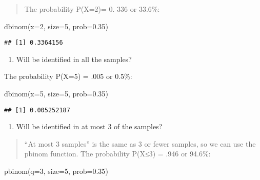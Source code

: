 \documentclass[
]{memoir}
\newenvironment{Shaded}{\begin{snugshade}}{\end{snugshade}}
\newcommand{\AttributeTok}[1]{\textcolor[rgb]{0.77,0.63,0.00}{#1}}
\newcommand{\DecValTok}[1]{\textcolor[rgb]{0.00,0.00,0.81}{#1}}
\newcommand{\FloatTok}[1]{\textcolor[rgb]{0.00,0.00,0.81}{#1}}
\newcommand{\FunctionTok}[1]{\textcolor[rgb]{0.00,0.00,0.00}{#1}}
\newcommand{\NormalTok}[1]{#1}
\providecommand{\tightlist}{%
  \setlength{\itemsep}{0pt}\setlength{\parskip}{0pt}}
\begin{document}
\begin{quote}
The probability P(X=2)= 0. 336 or 33.6\%:
\end{quote}

\begin{Shaded}
\begin{Highlighting}[]
\FunctionTok{dbinom}\NormalTok{(}\AttributeTok{x=}\DecValTok{2}\NormalTok{, }\AttributeTok{size=}\DecValTok{5}\NormalTok{, }\AttributeTok{prob=}\FloatTok{0.35}\NormalTok{)}
\end{Highlighting}
\end{Shaded}

\begin{verbatim}
## [1] 0.3364156
\end{verbatim}

\begin{enumerate}
\def\labelenumi{\alph{enumi})}
\setcounter{enumi}{2}
\tightlist
\item
  Will be identified in all the samples?
\end{enumerate}

The probability P(X=5) = .005 or 0.5\%:

\begin{Shaded}
\begin{Highlighting}[]
\FunctionTok{dbinom}\NormalTok{(}\AttributeTok{x=}\DecValTok{5}\NormalTok{, }\AttributeTok{size=}\DecValTok{5}\NormalTok{, }\AttributeTok{prob=}\FloatTok{0.35}\NormalTok{)}
\end{Highlighting}
\end{Shaded}

\begin{verbatim}
## [1] 0.005252187
\end{verbatim}

\begin{enumerate}
\def\labelenumi{\alph{enumi})}
\setcounter{enumi}{3}
\tightlist
\item
  Will be identified in at most 3 of the samples?
\end{enumerate}

\begin{quote}
``At most 3 samples'' is the same as 3 or fewer samples, so we can use the pbinom function. The probability P(X≤3) = .946 or 94.6\%:
\end{quote}

\begin{Shaded}
\begin{Highlighting}[]
\FunctionTok{pbinom}\NormalTok{(}\AttributeTok{q=}\DecValTok{3}\NormalTok{, }\AttributeTok{size=}\DecValTok{5}\NormalTok{, }\AttributeTok{prob=}\FloatTok{0.35}\NormalTok{)}
\end{Highlighting}
\end{Shaded}
\end{document}
